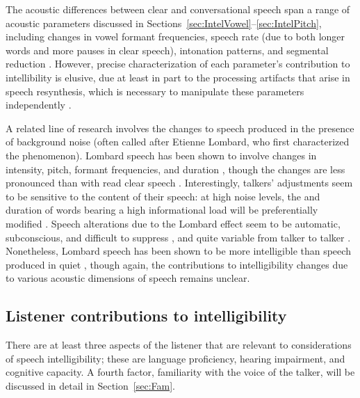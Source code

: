 The acoustic differences between clear and conversational speech span a range of acoustic parameters discussed in Sections~\ref{sec:IntelVowel}–\ref{sec:IntelPitch}, including changes in vowel formant frequencies, speech rate (due to both longer words and more pauses in clear speech), intonation patterns, and segmental reduction \citep[see][\intal]{PichenyEtAl1986, LiLoizou2008, SmiljanicBradlow2008, HazanBaker2011}.  However, precise characterization of each parameter’s contribution to intellibility is elusive, due at least in part to the processing artifacts that arise in speech resynthesis, which is necessary to manipulate these parameters independently \citep[cf. discussions in][]{PichenyEtAl1989, UchanskiEtAl1996, LiuZeng2006, KrauseBraida2009}.

A related line of research involves the changes to speech produced in the presence of background noise (often called  after Etienne Lombard, who first characterized the phenomenon).  Lombard speech has been shown to involve changes in intensity, pitch, formant frequencies, and duration \citep{LaneTranel1971, SummersEtAl1988}, though the changes are less pronounced than with read clear speech \citep{HazanBaker2011}.  Interestingly, talkers’ adjustments seem to be sensitive to the content of their speech: at high noise levels, the \fo{} and duration of words bearing a high informational load will be preferentially modified \citep{PatelSchell2008}.  Speech alterations due to the Lombard effect seem to be automatic, subconscious, and difficult to suppress \citep{PickEtAl1989}, and quite variable from talker to talker \citep{Junqua1993}.  Nonetheless, Lombard speech has been shown to be more intelligible than speech produced in quiet \citep{DreherONeill1957, SummersEtAl1988}, though again, the contributions to intelligibility changes due to various acoustic dimensions of speech remains unclear.


\subsection{Listener contributions to intelligibility}
There are at least three aspects of the listener that are relevant to considerations of speech intelligibility; these are language proficiency, hearing impairment, and cognitive capacity.  A fourth factor, familiarity with the voice of the talker, will be discussed in detail in Section~\ref{sec:Fam}.

